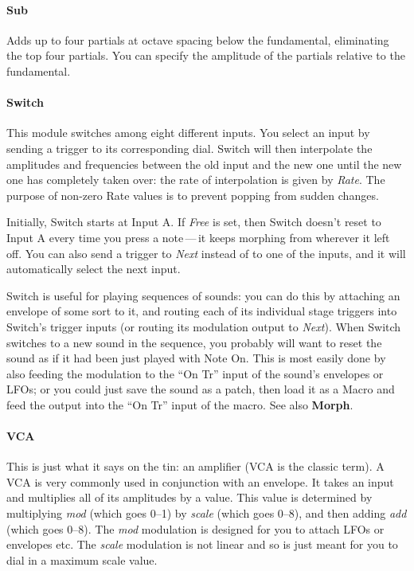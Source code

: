 \documentclass{article}
\begin{document}
\paragraph{Sub} Adds up to four partials at octave spacing below the fundamental, eliminating the top four partials.  You can specify the amplitude of the partials relative to the fundamental.


\paragraph{Switch} This module switches among eight different inputs.  You select an input by sending a trigger to its corresponding dial.  Switch will then interpolate the amplitudes and frequencies between the old input and the new one until the new one has completely taken over: the rate of interpolation is given by {\it Rate}.  The purpose of non-zero Rate values is to prevent popping from sudden changes.

Initially, Switch starts at Input A.  If {\it Free} is set, then Switch doesn't reset to Input A every time you press a note\,---\,it keeps morphing from wherever it left off.  You can also send a trigger to {\it Next} instead of to one of the inputs, and it will automatically select the next input.

Switch is useful for playing sequences of sounds: you can do this by attaching an envelope of some sort to it, and routing each of its individual stage triggers into Switch's trigger inputs (or routing its modulation output to {\it Next}).   When Switch switches to a new sound in the sequence, you probably will want to reset the sound as if it had been just played with Note On.  This is most easily done by also feeding the modulation to the ``On Tr'' input of the sound's envelopes or LFOs; or you could just save the sound as a patch, then load it as a Macro and feed the output into the ``On Tr'' input of the macro.   See also {\bf Morph}.

\paragraph{VCA} This is just what it says on the tin: an amplifier (VCA is the classic term).  A VCA is very commonly used in conjunction with an envelope.  It takes an input and multiplies all of its amplitudes by a value.  This value is determined by multiplying {\it mod} (which goes 0--1) by {\it scale} (which goes 0--8), and then adding {\it add} (which goes 0--8).  The {\it mod} modulation is designed for you to attach LFOs or envelopes etc.  The {\it scale} modulation is not linear and so is just meant for you to dial in a maximum scale value.   
\end{document}
